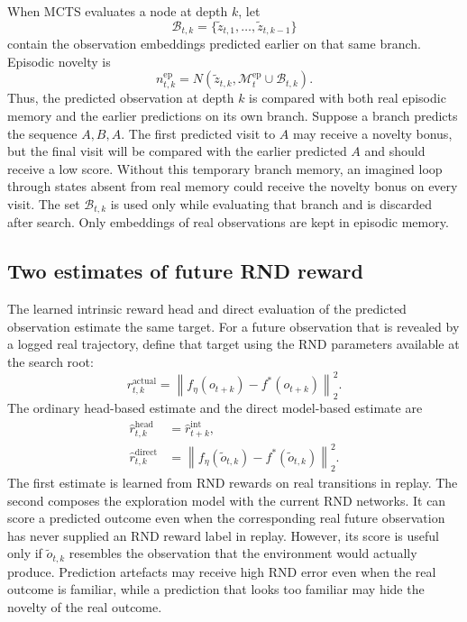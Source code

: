 \documentclass{article}
\begin{document}
When MCTS evaluates a node at depth $k$, let
\begin{equation}
    \mathcal{B}_{t,k}
      =\{\tilde z_{t,1},\ldots,\tilde z_{t,k-1}\}
\end{equation}
contain the observation embeddings predicted earlier on that same branch.
Episodic novelty is
\begin{equation}
    n^{\mathrm{ep}}_{t,k}
        =N\left(
          \tilde z_{t,k},
          \mathcal{M}^{\mathrm{ep}}_t\cup\mathcal{B}_{t,k}
          \right).
\end{equation}
Thus, the predicted observation at depth $k$ is compared with both real
episodic memory and the earlier predictions on its own branch. Suppose a branch
predicts the sequence $A,B,A$. The first predicted visit to $A$ may receive a
novelty bonus,
but the final visit will be compared with the earlier predicted $A$ and should
receive a low score. Without this temporary branch memory, an imagined loop
through states absent from real memory could receive the novelty bonus on every
visit. The set $\mathcal{B}_{t,k}$ is used only while evaluating that branch
and is discarded after search. Only embeddings of real observations are kept
in episodic memory.

\subsection{Two estimates of future RND reward}

The learned intrinsic reward head and direct evaluation of the predicted
observation estimate the same target. For a future observation that is revealed
by a logged real trajectory, define that target using the RND parameters
available at the search root:
\begin{equation}
    r^{\mathrm{actual}}_{t,k}
      =\left\|f_\eta(o_{t+k})-f^\ast(o_{t+k})\right\|_2^2.
\end{equation}
The ordinary head-based estimate and the direct model-based estimate are
\begin{align}
    \hat r^{\mathrm{head}}_{t,k}
      &=\hat r^{\mathrm{int}}_{t+k}, \\
    \hat r^{\mathrm{direct}}_{t,k}
      &=\left\|f_\eta(\tilde o_{t,k})
                    -f^\ast(\tilde o_{t,k})\right\|_2^2.
\end{align}
The first estimate is learned from RND rewards on real transitions in replay.
The second composes the exploration model with the current RND networks. It can
score a predicted outcome even when the corresponding real future observation
has never supplied an RND reward label in replay. However, its score is useful
only if $\tilde o_{t,k}$ resembles the observation that the environment would
actually produce. Prediction artefacts may receive high RND error even when the
real outcome is familiar, while a prediction that looks too familiar may hide
the novelty of the real outcome.
\end{document}
